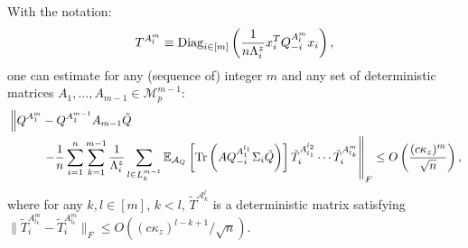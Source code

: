 \documentclass[a4papaer, titlepage]{book}
\begin{document}
\begin{proposition}\label{pro:estimation_QA}
With the notation:
  \begin{align*}
    T^{A^{m}_{l}}\equiv \operatorname{Diag}_{i\in[m]} \left( \frac{1}{n\Lambda_i^z}x_i^TQ_{-i}^{A^{m}_{l}}x_i \right), 
  \end{align*}  
  one can estimate for any (sequence of) integer $m$ and any set of deterministic matrices $A_1,\ldots, A_{m-1} \in \mathcal{M}_{p}^{m-1}$:
  \begin{align*}
    &\left\Vert Q^{A_1^m} - Q^{A_1^{m-1}}A_{m-1} \tilde Q \right.\\
    &\hspace{1cm} \left. -  \frac{1}{n} \sum_{i=1}^n\sum_{k=1}^{m-1}\frac{1}{\Lambda_i^z}\sum_{l\in L_k^{m-1}}\mathbb{E}_{\mathcal A_Q}\left[ \operatorname{Tr} \left(  A Q_{-i}^{A_1^{l_1}}\Sigma_i\tilde Q\right)\right]\tilde T_i^{A^{l_2}_{l_1}}\cdots \tilde T_i^{A^{m}_{l_k}}\right\Vert_F
    \leq O\left( \frac{(c\kappa_z)^{m}}{\sqrt n} \right),
  \end{align*}
  where for any $k,l \in [m]$, $k<l$, $\tilde T^{\mathcal A_k^l}$ is a deterministic matrix satisfying $\|\tilde T_i^{A^{m}_{l_k}} - \tilde T_i^{A^{m}_{l_k}}\|_F \leq O((c\kappa_z)^{l-k+1}/\sqrt n)$.
\end{proposition}
\end{document}
